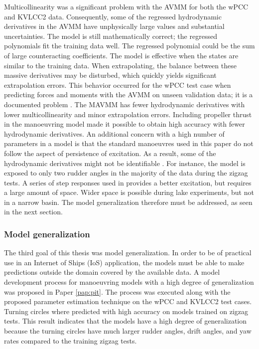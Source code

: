 Multicollinearity was a significant problem with the AVMM for both the wPCC and KVLCC2 data. Consequently, some of the regressed hydrodynamic derivatives in the AVMM have unphysically large values and substantial uncertainties. The model is still mathematically correct; the regressed polynomials fit the training data well. The regressed polynomial could be the sum of large counteracting coefficients. The model is effective when the states are similar to the training data. When extrapolating, the balance between these massive derivatives may be disturbed, which quickly yields significant extrapolation errors. This behavior occurred for the wPCC test case when predicting forces and moments with the AVMM on unseen validation data; it is a documented problem \cite{ittc_maneuvering_2008}.
The MAVMM has fewer hydrodynamic derivatives with lower multicollinearity and minor extrapolation errors. Including propeller thrust in the manoeuvring model made it possible to obtain high accuracy with fewer hydrodynamic derivatives. An additional concern with a high number of parameters in a model is that the standard manoeuvres used in this paper do not follow the aspect of persistence of excitation. As a result, some of the hydrodynamic derivatives might not be identifiable \cite{revestido_herrero_two-step_2012}. For instance, the model is exposed to only two rudder angles in the majority of the data during the zigzag tests. A series of step responses used in \cite{miller_ship_2021} provides a better excitation, but requires a large amount of space. Wider space is possible during lake experiments, but not in a narrow basin. The model generalization therefore must be addressed, as seen in the next section.

\subsubsection*{Model generalization} 
The third goal of this thesis was model generalization. In order to be of practical use in an Internet of Ships (IoS) application, the models must be able to make predictions outside the domain covered by the available data. A model development process for manoeuvring models with a high degree of generalization was proposed in Paper \ref{pap:pit}.
The process was executed along with the proposed parameter estimation technique on the wPCC and KVLCC2 test cases. Turning circles where predicted with high accuracy on models trained on zigzag tests. This result indicates that the models have a high degree of generalization because the turning circles have much larger rudder angles, drift angles, and yaw rates compared to the training zigzag tests. 
